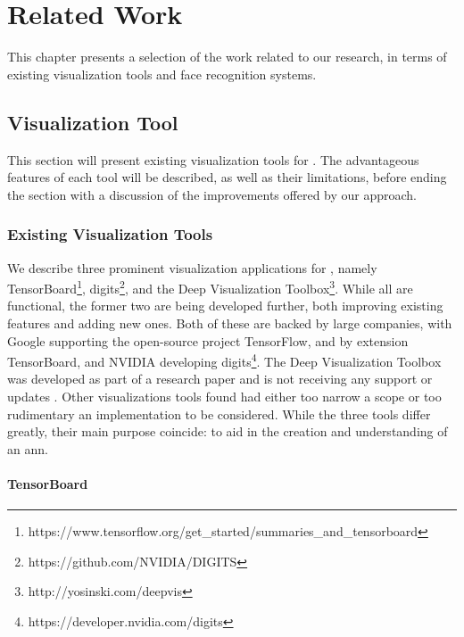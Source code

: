 
\chapter{Related Work}

This chapter presents a selection of the work related to our research, in terms of existing visualization tools and face recognition systems.

\section{Visualization Tool}

This section will present existing visualization tools for . The advantageous features of each tool will be described, as well as their limitations, before ending the section with a discussion of the improvements offered by our approach. 

\subsection{Existing Visualization Tools}

We describe three prominent visualization applications for , namely TensorBoard\footnote{https://www.tensorflow.org/get\_started/summaries\_and\_tensorboard}, \acrfull{digits}\footnote{https://github.com/NVIDIA/DIGITS}, and the Deep Visualization Toolbox\footnote{http://yosinski.com/deepvis}. While all are functional, the former two are being developed further, both improving existing features and adding new ones. Both of these are backed by large companies, with Google supporting the open-source project TensorFlow, and by extension TensorBoard, and NVIDIA developing \acrshort{digits}\footnote{https://developer.nvidia.com/digits}. The Deep Visualization Toolbox was developed as part of a research paper and is not receiving any support or updates \cite{yosinski-deepvis}. Other visualizations tools found had either too narrow a scope or too rudimentary an implementation to be considered. While the three tools differ greatly, their main purpose coincide: to aid in the creation and understanding of an \acrshort{ann}.

\subsubsection{TensorBoard}

